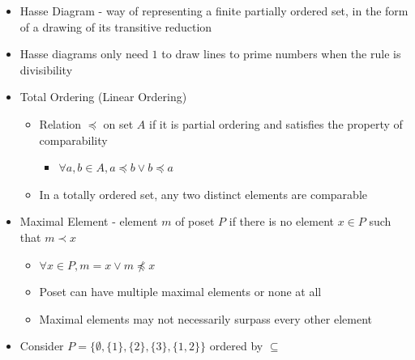 \documentclass{article}
\begin{document}
\begin{itemize}
\begin{itemize}
        \item We can see that for all $a \in S$, $a \preceq a$ (reflexivity)
        \item Also, $a \preceq b \Longleftrightarrow (\exists k \in \mathbb{Z} - \{0\}) \ b = ka$/ If, in addition, $b \preceq a$, then $k, \frac{1}{k} \in \mathbb{Z} - \{0\} \Rightarrow k=1$. Therefore, $a=b$ (antisymmetry).
        \item Suppose $a \preceq b$ and $b \preceq c$. Then $(\exists k \in \mathbb{Z} - \{0\}) \ b = ka$ and $(\exists l \in \mathbb{Z} - \{0\}) \ c = lb$. Therefore, $c = (lk)a$ and $lk \in \mathbb{Z} - \{0\}$, and so $(\exists m \in \mathbb{Z} - \{0\}) \ c = ma$. Hence $a \preceq c$ (transitivity).
        \item Therefore, the set $S$ with the relation $a \preceq b$ if $a$ divides $b$ is a poset.
    \end{itemize}
    \item Hasse Diagram - way of representing a finite partially ordered set, in the form of a drawing of its transitive reduction
    \item Hasse diagrams only need $1$ to draw lines to prime numbers when the rule is divisibility
    \item Total Ordering (Linear Ordering)
    \begin{itemize}
        \item Relation $\preceq$ on set $A$ if it is partial ordering and satisfies the property of comparability
        \begin{itemize}
            \item $\forall a,b \in A, a \preceq b \vee b \preceq a$
        \end{itemize}
        \item In a totally ordered set, any two distinct elements are comparable
    \end{itemize}
    \item Maximal Element - element $m$ of poset $P$ if there is no element $x \in P$ such that $m \prec x$
    \begin{itemize}
        \item $\forall x \in P, m=x \vee m \npreceq x$
        \item Poset can have multiple maximal elements or none at all
        \item Maximal elements may not necessarily surpass every other element
    \end{itemize}
    \item Consider $P=\{\emptyset, \{1\}, \{2\}, \{3\}, \{1,2\}\}$ ordered by $\subseteq$

\end{itemize}
\end{document}
